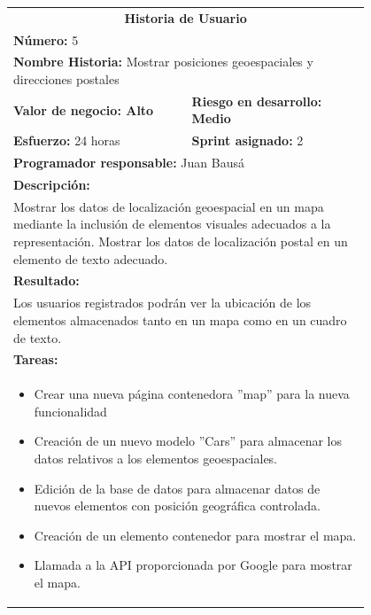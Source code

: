	\begin{table}[H]
	  \centering 
	 	\begin{tabular}{p{0.4\linewidth}p{0.4\linewidth}}
	    \toprule
	    \multicolumn{2}{c}{\cellcolor{black!30}\textbf{Historia de Usuario}} 													\\
		\multicolumn{2}{l}{\cellcolor{gray!25}\textbf{Número: }5}																\\
		\multicolumn{2}{l}{\textbf{Nombre Historia: } Mostrar posiciones geoespaciales y direcciones postales}				\\
		\cellcolor{gray!25}\textbf{Valor de negocio: Alto}	&	\cellcolor{gray!25}\textbf{Riesgo en desarrollo: Medio}		\\
		\textbf{Esfuerzo:} 24 horas				&	\textbf{Sprint asignado: }2 												\\
		\multicolumn{2}{l}{\cellcolor{gray!25}\textbf{Programador responsable: }Juan Bausá}									\\
		\multicolumn{2}{l}{\textbf{Descripción:}}                                                     						\\
		\multicolumn{2}{l}{\parbox{15cm}{Mostrar los datos de localización geoespacial en un mapa mediante la inclusión de elementos visuales adecuados a la representación. Mostrar los datos de localización postal en un elemento de texto adecuado.}}				\\
		\multicolumn{2}{l}{\cellcolor{gray!25}\textbf{Resultado:}}																\\		
		\multicolumn{2}{l}{\parbox{15cm}{Los usuarios registrados podrán ver la ubicación de los elementos almacenados tanto en un mapa como en un cuadro de texto.}}																									\\
		\multicolumn{2}{l}{\textbf{Tareas:}}																					\\
		\multicolumn{2}{l}{
			\begin{minipage}{12cm}
	    		\vskip 4pt
	    		\begin{itemize}
	    			\item Crear una nueva página contenedora ''map'' para la nueva funcionalidad
	    			\item Creación de un nuevo modelo ''Cars'' para almacenar los datos relativos a los elementos geoespaciales.
	    			\item Edición de la base de datos para almacenar datos de nuevos elementos con posición geográfica controlada.
	    			\item Creación de un elemento contenedor para mostrar el mapa.
	    			\item Llamada a la API proporcionada por Google para mostrar el mapa.

\end{itemize}
\end{minipage}}
\end{tabular}
\end{table}
